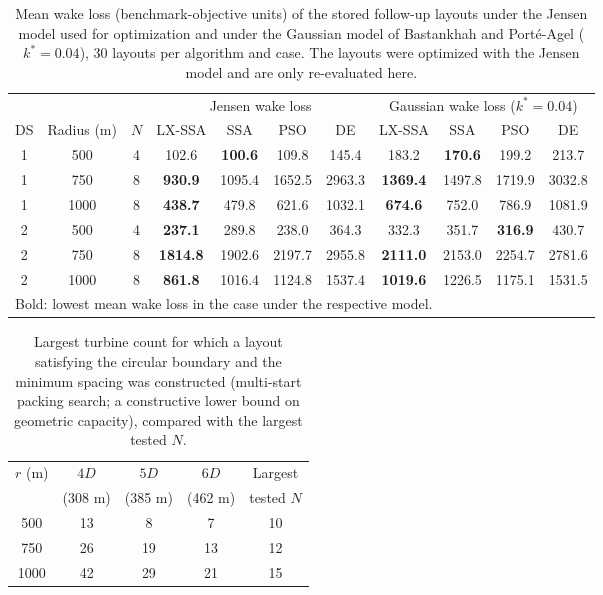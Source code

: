 \begin{table}[!t]
\centering
\caption{Mean wake loss (benchmark-objective units) of the stored follow-up layouts under the Jensen model used for optimization and under the Gaussian model of Bastankhah and Port\'e-Agel ($k^*=0.04$), 30 layouts per algorithm and case. The layouts were optimized with the Jensen model and are only re-evaluated here.}
\label{tab:gaussian}
\footnotesize\setlength{\tabcolsep}{4pt}
\begin{tabular}{ccccccccccc}
\toprule
& & & \multicolumn{4}{c}{Jensen wake loss} & \multicolumn{4}{c}{Gaussian wake loss ($k^*=0.04$)} \\
\cmidrule(lr){4-7}\cmidrule(lr){8-11}
DS & Radius (m) & $N$ & LX-SSA & SSA & PSO & DE & LX-SSA & SSA & PSO & DE \\
\midrule
1 & 500 & 4 & 102.6 & \textbf{100.6} & 109.8 & 145.4 & 183.2 & \textbf{170.6} & 199.2 & 213.7 \\
1 & 750 & 8 & \textbf{930.9} & 1095.4 & 1652.5 & 2963.3 & \textbf{1369.4} & 1497.8 & 1719.9 & 3032.8 \\
1 & 1000 & 8 & \textbf{438.7} & 479.8 & 621.6 & 1032.1 & \textbf{674.6} & 752.0 & 786.9 & 1081.9 \\
2 & 500 & 4 & \textbf{237.1} & 289.8 & 238.0 & 364.3 & 332.3 & 351.7 & \textbf{316.9} & 430.7 \\
2 & 750 & 8 & \textbf{1814.8} & 1902.6 & 2197.7 & 2955.8 & \textbf{2111.0} & 2153.0 & 2254.7 & 2781.6 \\
2 & 1000 & 8 & \textbf{861.8} & 1016.4 & 1124.8 & 1537.4 & \textbf{1019.6} & 1226.5 & 1175.1 & 1531.5 \\
\bottomrule
\multicolumn{11}{l}{\footnotesize Bold: lowest mean wake loss in the case under the respective model.}
\end{tabular}
\end{table}

\begin{table}[!t]
\centering
\caption{Largest turbine count for which a layout satisfying the circular boundary and the minimum spacing was constructed (multi-start packing search; a constructive lower bound on geometric capacity), compared with the largest tested $N$.}
\label{tab:capacity}
\footnotesize
\begin{tabular}{ccccc}
\toprule
$r$ (m) & $4D$ & $5D$ & $6D$ & Largest \\
 & (308 m) & (385 m) & (462 m) & tested $N$ \\
\midrule
500 & 13 & 8 & 7 & 10 \\
750 & 26 & 19 & 13 & 12 \\
1000 & 42 & 29 & 21 & 15 \\
\bottomrule
\end{tabular}
\end{table}

